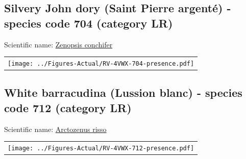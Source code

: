 \documentclass[12pt]{article}\usepackage[]{graphicx}\usepackage[]{color}
\begin{document}
\setcounter{figure}{0}

\hypertarget{sec:704}{%
\subsection{Silvery John dory (Saint Pierre argenté) - species code 704 (category LR)}\label{sec:704}}

  


Scientific name: \href{http://www.marinespecies.org/aphia.php?p=taxdetails\&id=127426}{Zenopsis conchifer} \newline
\begin{minipage}{1.0\textwidth}
 \begin{tabular}{c}
\texttt{[image: ../Figures-Actual/RV-4VWX-704-presence.pdf]} \\ 
\end{tabular} 
\end{minipage}
\clearpage

\renewcommand\thefigure{\thesubsection\Alph{figure}}

\setcounter{figure}{0}

\hypertarget{sec:712}{%
\subsection{White barracudina (Lussion blanc) - species code 712 (category LR)}\label{sec:712}}

  


Scientific name: \href{http://www.marinespecies.org/aphia.php?p=taxdetails\&id=126352}{Arctozenus risso} \newline
\begin{minipage}{1.0\textwidth}
 \begin{tabular}{c}
\texttt{[image: ../Figures-Actual/RV-4VWX-712-presence.pdf]} \\ 
\end{tabular} 
\end{minipage}
\clearpage

\renewcommand\thefigure{\thesubsection\Alph{figure}}

\setcounter{figure}{0}
\end{document}
